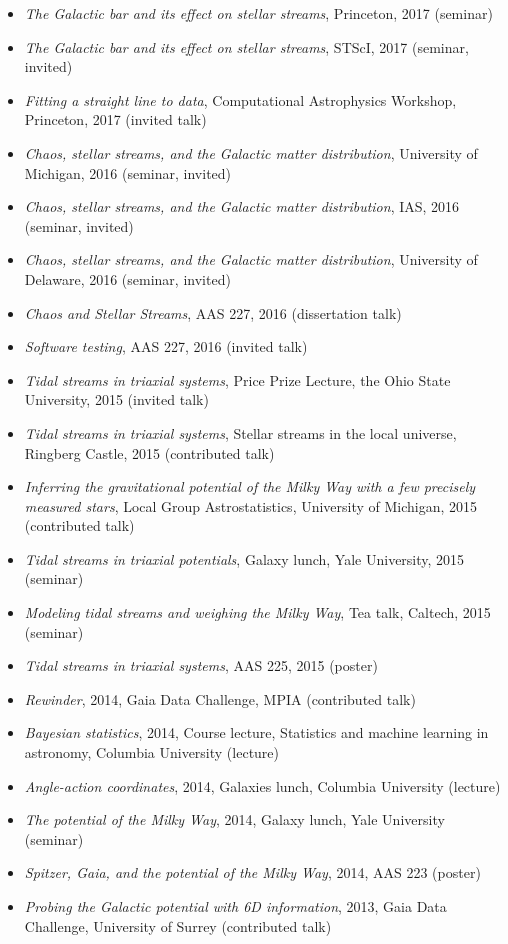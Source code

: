 \documentclass[12pt,letterpaper]{article}
\begin{document}
\begin{itemize}
    \item \emph{The Galactic bar and its effect on stellar streams}, Princeton, 2017 (seminar)
    \item \emph{The Galactic bar and its effect on stellar streams}, STScI, 2017 (seminar, invited)
    \item \emph{Fitting a straight line to data}, Computational Astrophysics Workshop, Princeton, 2017 (invited talk)
    \item \emph{Chaos, stellar streams, and the Galactic matter distribution}, University of Michigan, 2016 (seminar, invited)
    \item \emph{Chaos, stellar streams, and the Galactic matter distribution}, IAS, 2016 (seminar, invited)
    \item \emph{Chaos, stellar streams, and the Galactic matter distribution}, University of Delaware, 2016 (seminar, invited)
	\item \emph{Chaos and Stellar Streams}, AAS 227, 2016 (dissertation talk)
    \item \emph{Software testing}, AAS 227, 2016 (invited talk)
    \item \emph{Tidal streams in triaxial systems}, Price Prize Lecture, the Ohio State University, 2015 (invited talk)
	\item \emph{Tidal streams in triaxial systems}, Stellar streams in the local universe, Ringberg Castle, 2015 (contributed talk)
    \item \emph{Inferring the gravitational potential of the Milky Way with a few precisely measured stars}, Local Group Astrostatistics, University of Michigan, 2015 (contributed talk)
    \item \emph{Tidal streams in triaxial potentials}, Galaxy lunch, Yale University, 2015 (seminar)
	\item \emph{Modeling tidal streams and weighing the Milky Way}, Tea talk, Caltech, 2015 (seminar)
	\item \emph{Tidal streams in triaxial systems}, AAS 225, 2015 (poster)
	\item \emph{Rewinder}, 2014, Gaia Data Challenge, MPIA (contributed talk)
	\item \emph{Bayesian statistics}, 2014, Course lecture, Statistics and machine learning in astronomy, Columbia University (lecture)
	\item \emph{Angle-action coordinates}, 2014, Galaxies lunch, Columbia University (lecture)
	\item \emph{The potential of the Milky Way}, 2014, Galaxy lunch, Yale University (seminar)
	\item \emph{Spitzer, Gaia, and the potential of the Milky Way}, 2014, AAS 223 (poster)
	\item \emph{Probing the Galactic potential with 6D information}, 2013, Gaia Data Challenge, University of Surrey (contributed talk)

\end{itemize}
\end{document}
